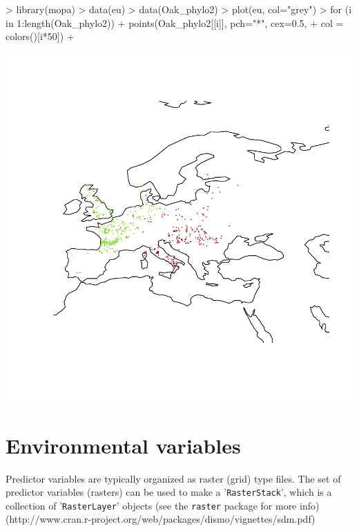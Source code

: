 \documentclass[10pt,a4paper]{report}
\begin{document}
\begin{Schunk}
\begin{Sinput}
> library(mopa)
> data(eu)
> data(Oak_phylo2)
> plot(eu, col="grey")
> for (i in 1:length(Oak_phylo2)){
+   points(Oak_phylo2[[i]], pch="*", cex=0.5, 
+          col = colors()[i*50])
+ }
\end{Sinput}
\end{Schunk}
\includegraphics{mopa-mopa2}

\section{Environmental variables}

Predictor variables are typically organized as raster (grid) type files. The set of predictor variables (rasters) can be used to make a '\texttt{RasterStack}', which is a collection of '\texttt{RasterLayer}' objects (see the \texttt{raster} package for more info) (http://www.cran.r-project.org/web/packages/dismo/vignettes/sdm.pdf)
\end{document}
